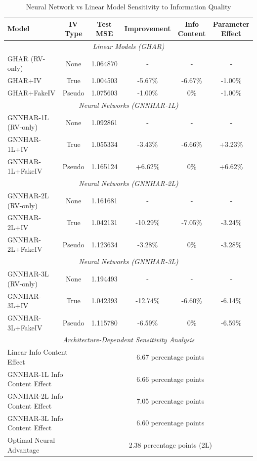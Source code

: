 \documentclass[12pt,a4paper]{article}
\begin{document}
\begin{table}[htbp]
\centering
\caption{Neural Network vs Linear Model Sensitivity to Information Quality}
\label{tab:iv_sensitivity_comparison}
\begin{tabular}{lccccc}
\toprule
Model & IV Type & Test MSE & Improvement & Info Content & Parameter Effect \\
\midrule
\multicolumn{6}{c}{\textit{Linear Models (GHAR)}} \\
GHAR (RV-only) & None & 1.064870 & - & - & - \\
GHAR+IV & True & 1.004503 & -5.67\% & -6.67\% & -1.00\% \\
GHAR+FakeIV & Pseudo & 1.075603 & -1.00\% & 0\% & -1.00\% \\
\midrule
\multicolumn{6}{c}{\textit{Neural Networks (GNNHAR-1L)}} \\
GNNHAR-1L (RV-only) & None & 1.092861 & - & - & - \\
GNNHAR-1L+IV & True & 1.055334 & -3.43\% & -6.66\% & +3.23\% \\
GNNHAR-1L+FakeIV & Pseudo & 1.165124 & +6.62\% & 0\% & +6.62\% \\
\midrule
\multicolumn{6}{c}{\textit{Neural Networks (GNNHAR-2L)}} \\
GNNHAR-2L (RV-only) & None & 1.161681 & - & - & - \\
GNNHAR-2L+IV & True & 1.042131 & -10.29\% & -7.05\% & -3.24\% \\
GNNHAR-2L+FakeIV & Pseudo & 1.123634 & -3.28\% & 0\% & -3.28\% \\
\midrule
\multicolumn{6}{c}{\textit{Neural Networks (GNNHAR-3L)}} \\
GNNHAR-3L (RV-only) & None & 1.194493 & - & - & - \\
GNNHAR-3L+IV & True & 1.042393 & -12.74\% & -6.60\% & -6.14\% \\
GNNHAR-3L+FakeIV & Pseudo & 1.115780 & -6.59\% & 0\% & -6.59\% \\
\midrule
\multicolumn{6}{c}{\textit{Architecture-Dependent Sensitivity Analysis}} \\
\multicolumn{2}{l}{Linear Info Content Effect} & \multicolumn{4}{c}{6.67 percentage points} \\
\multicolumn{2}{l}{GNNHAR-1L Info Content Effect} & \multicolumn{4}{c}{6.66 percentage points} \\
\multicolumn{2}{l}{GNNHAR-2L Info Content Effect} & \multicolumn{4}{c}{7.05 percentage points} \\
\multicolumn{2}{l}{GNNHAR-3L Info Content Effect} & \multicolumn{4}{c}{6.60 percentage points} \\
\multicolumn{2}{l}{Optimal Neural Advantage} & \multicolumn{4}{c}{2.38 percentage points (2L)} \\
\bottomrule
\end{tabular}
\end{table}
\end{document}
